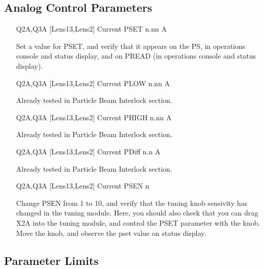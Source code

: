\documentclass[11pt]{book}		%
\begin{document}
\color{black}


\subsection{Analog Control Parameters}\label{sect:cyc-equip-ctl-beamline-quad23b-analog-control}

\begin{enumerate}
 \item [Q2A,Q3A] [Lens13,Lens2] Current PSET  n.nn A

\color{red}
Set a value for PSET, and verify that it appears on the PS, in operations console and status display, and on PREAD (in operations console and status display).
\color{black}

 \item [Q2A,Q3A] [Lens13,Lens2] Current PLOW  n.nn A

\color{red}
Already tested in Particle Beam Interlock section.
\color{black}

 \item [Q2A,Q3A] [Lens13,Lens2] Current PHIGH n.nn A

\color{red}
Already tested in Particle Beam Interlock section.
\color{black}

 \item [Q2A,Q3A] [Lens13,Lens2] Current PDiff n.n A

\color{red}
Already tested in Particle Beam Interlock section.
\color{black}

 \item [Q2A,Q3A] [Lens13,Lens2] Current PSEN  n

\color{red}

Change PSEN from 1 to 10, and verify that the tuning knob sensivity has changed in the tuning module. Here, you should also check that you can drag X2A into the tuning module, and control the PSET parameter with the knob. Move the knob, and observe the pset value on status display.

\color{black}

\end{enumerate}

\subsection{Parameter Limits} \label{sect:cyc-equip-ctl-beamline-quad23b-analog-control-limits}
\end{document}
